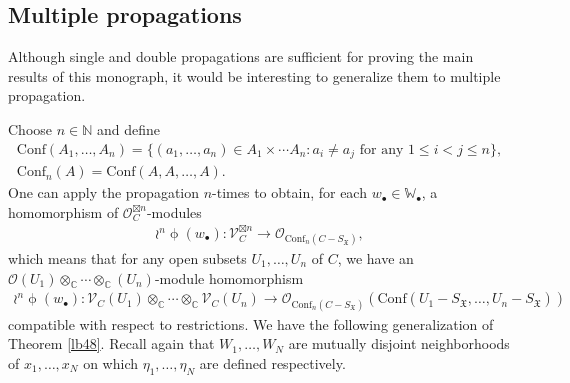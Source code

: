 \documentclass[12pt,a4paper,notitlepage]{report}
\theoremstyle{definition}
\theoremstyle{plain}
\newcommand{\fk}{\mathfrak}
\newcommand{\Conf}{\mathrm{Conf}}
\newcommand{\scr}{\mathscr}
\newcommand{\blt}{\bullet}
\newcommand{\Wbb}{\mathbb W}
\newcommand{\Cbb}{\mathbb C}
\newcommand{\Nbb}{\mathbb N}
\numberwithin{equation}{section}
\begin{document}
\subsection*{Multiple propagations}

Although single and double propagations are sufficient for proving the main results of this monograph, it would be interesting to generalize them to multiple propagation.

Choose $n\in\Nbb$ and define \index{Conf@$\Conf$}
\begin{gather*}
\Conf(A_1,\dots,A_n)=\{(a_1,\dots,a_n)\in A_1\times\cdots A_n:a_i\neq a_j\text{ for any }1\leq i<j\leq n\},\\
\Conf_n(A)=\Conf(A,A,\dots,A).
\end{gather*}
One can apply the propagation $n$-times  to obtain, for each $w_\blt\in\Wbb_\blt$, a homomorphism of $\scr O_C^{\boxtimes n}$-modules
\begin{align}
\wr^n\upphi(w_\blt):\scr V_C^{\boxtimes n}\rightarrow\scr O_{\Conf_n(C-S_{\fk X})},
\end{align}
which means that for any open subsets $U_1,\dots,U_n$ of $C$, we have  an $\scr O(U_1)\otimes_\Cbb\cdots\otimes_\Cbb(U_n)$-module  homomorphism
\begin{align*}
\wr^n\upphi(w_\blt):\scr V_C(U_1)\otimes_\Cbb\cdots\otimes_\Cbb\scr V_C(U_n)\rightarrow\scr O_{\Conf_n(C-S_{\fk X})}(\Conf(U_1-S_{\fk X},\dots,U_n-S_{\fk X}))
\end{align*}
compatible with respect to restrictions. We have the following generalization of Theorem \ref{lb48}. Recall again that $W_1,\dots,W_N$ are mutually disjoint neighborhoods of $x_1,\dots,x_N$ on which $\eta_1,\dots,\eta_N$ are defined respectively.
\end{document}
